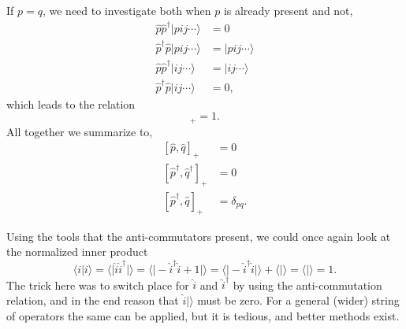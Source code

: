 If $p = q$, we need to investigate both when $p$ is already present and not,
\begin{equation}
\begin{split}
\hat{p} \hat{p}^{\dagger} |p ij\cdots \rangle &= 0 \\
\hat{p}^{\dagger} \hat{p} |p ij\cdots \rangle &= |pij\cdots \rangle \\
\hat{p} \hat{p}^{\dagger} |ij\cdots \rangle &= |ij\cdots \rangle \\
\hat{p}^{\dagger} \hat{p} |ij\cdots \rangle &= 0  ,
\end{split}
\end{equation}
which leads to the relation
\begin{equation}
[\hat{p}^{\dagger}, \hat{p}]_+ = 1 .
\end{equation}
All together we summarize to,
\begin{equation}
\label{eq:manybody:anticommutators}
\begin{split}
[\hat{p},\hat{q}]_+ &= 0 \\
[\hat{p}^{\dagger},\hat{q}^{\dagger}]_+ &= 0 \\
[\hat{p}^{\dagger},\hat{q}]_+ &= \delta_{pq} .
\end{split}
\end{equation}

Using the tools that the anti-commutators present, we could once again look at the normalized inner product
\begin{equation}
\langle i | i \rangle = \langle | \hat{i}\hat{i}^{\dagger} | \rangle
= \langle | -\hat{i}^{\dagger} \hat{i} + 1 | \rangle
= \langle | -\hat{i}^{\dagger} \hat{i} | \rangle + \langle | \rangle
= \langle | \rangle = 1 .
\end{equation}
The trick here was to switch place for $\hat{i}$ and $\hat{i}^{\dagger}$ by using the anti-commutation relation, and in the end reason that $\hat{i}|\rangle$ must be zero. 
For a general (wider) string of operators the same can be applied, but it is tedious, and better methods exist.



